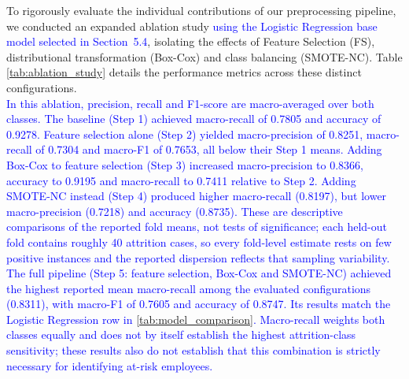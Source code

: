 \documentclass[a4paper,fleqn]{cas-sc}
\begin{document}

To rigorously evaluate the individual contributions of our preprocessing pipeline, we conducted an expanded ablation study \textcolor{blue}{using the Logistic Regression base model selected in Section~5.4}, isolating the effects of Feature Selection (FS), distributional transformation (Box-Cox) and class balancing (SMOTE-NC). Table \ref{tab:ablation_study} details the performance metrics across these distinct configurations.\\
\textcolor{blue}{In this ablation, precision, recall and F1-score are macro-averaged over both classes. The baseline (Step 1) achieved macro-recall of 0.7805 and accuracy of 0.9278. Feature selection alone (Step 2) yielded macro-precision of 0.8251, macro-recall of 0.7304 and macro-F1 of 0.7653, all below their Step 1 means.}
\textcolor{blue}{Adding Box-Cox to feature selection (Step 3) increased macro-precision to 0.8366, accuracy to 0.9195 and macro-recall to 0.7411 relative to Step 2. Adding SMOTE-NC instead (Step 4) produced higher macro-recall (0.8197), but lower macro-precision (0.7218) and accuracy (0.8735). These are descriptive comparisons of the reported fold means, not tests of significance; each held-out fold contains roughly 40 attrition cases, so every fold-level estimate rests on few positive instances and the reported dispersion reflects that sampling variability.}
\textcolor{blue}{The full pipeline (Step 5: feature selection, Box-Cox and SMOTE-NC) achieved the highest reported mean macro-recall among the evaluated configurations (0.8311), with macro-F1 of 0.7605 and accuracy of 0.8747. Its results match the Logistic Regression row in \cref{tab:model_comparison}. Macro-recall weights both classes equally and does not by itself establish the highest attrition-class sensitivity; these results also do not establish that this combination is strictly necessary for identifying at-risk employees.}
\end{document}
